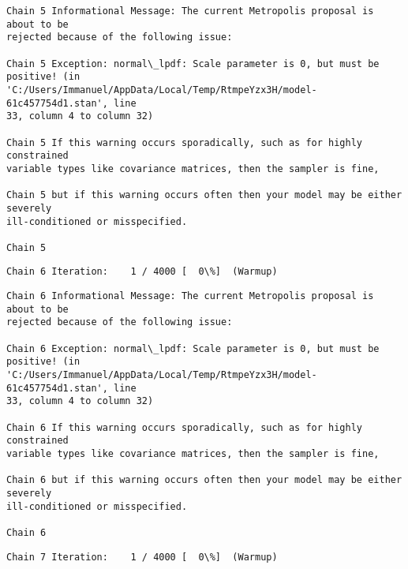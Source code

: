 \documentclass[11pt]{article}
\begin{document}
    \begin{Verbatim}[commandchars=\\\{\}]
Chain 5 Informational Message: The current Metropolis proposal is about to be
rejected because of the following issue:

Chain 5 Exception: normal\_lpdf: Scale parameter is 0, but must be positive! (in
'C:/Users/Immanuel/AppData/Local/Temp/RtmpeYzx3H/model-61c457754d1.stan', line
33, column 4 to column 32)

Chain 5 If this warning occurs sporadically, such as for highly constrained
variable types like covariance matrices, then the sampler is fine,

Chain 5 but if this warning occurs often then your model may be either severely
ill-conditioned or misspecified.

Chain 5

    \end{Verbatim}

    \begin{Verbatim}[commandchars=\\\{\}]
Chain 6 Iteration:    1 / 4000 [  0\%]  (Warmup)
    \end{Verbatim}

    \begin{Verbatim}[commandchars=\\\{\}]
Chain 6 Informational Message: The current Metropolis proposal is about to be
rejected because of the following issue:

Chain 6 Exception: normal\_lpdf: Scale parameter is 0, but must be positive! (in
'C:/Users/Immanuel/AppData/Local/Temp/RtmpeYzx3H/model-61c457754d1.stan', line
33, column 4 to column 32)

Chain 6 If this warning occurs sporadically, such as for highly constrained
variable types like covariance matrices, then the sampler is fine,

Chain 6 but if this warning occurs often then your model may be either severely
ill-conditioned or misspecified.

Chain 6

    \end{Verbatim}

    \begin{Verbatim}[commandchars=\\\{\}]
Chain 7 Iteration:    1 / 4000 [  0\%]  (Warmup)
    \end{Verbatim}
\end{document}
